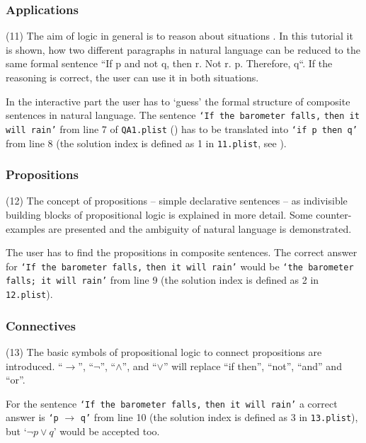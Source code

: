 \subsubsection{Applications}
\label{tut:11}

(11) The aim of logic in general is to reason about situations \cite{Huth:2004:LCS:975331}. 
In this tutorial it is shown, how two different paragraphs in natural language 
can be reduced to the same formal sentence “If p and not q, then r. Not r. p. Therefore, q“. 
If the reasoning is correct, the user can use it in both situations. 

In the interactive part the user has to ‘guess’ the formal structure of composite sentences in natural language. 
The sentence 
\verb+‘If the barometer falls,+ \verb+then it will rain’+ 
from line 7 of \verb+QA1.plist+ ()
has to be translated into
\verb+‘if p then q’+ from line 8 (the solution index is defined as 1 in \verb+11.plist+, see ).

\subsubsection{Propositions}
\label{tut:12}

(12) The concept of propositions – simple declarative sentences – 
as indivisible building blocks of propositional logic 
is explained in more detail. Some counter-examples are presented 
and the ambiguity of natural language is demonstrated.

The user has to find the propositions in composite sentences. 
The correct answer for 
\verb+‘If the barometer falls,+ \verb+then it will rain’+ 
would be  
\verb+‘the barometer falls; it will rain’+ 
from line 9 
(the solution index is defined as 2 in \verb+12.plist+).


\subsubsection{Connectives}
\label{tut:13}

(13) The basic symbols of propositional logic to connect propositions are introduced. 
“$\rightarrow$”, “$\neg$”, “$\wedge$”, and “$\vee$”
 will replace “if then”, “not”, “and” and “or”. 

For the sentence
\verb+‘If the barometer falls,+ \verb+then it will rain’+ 
a correct answer is
\verb+‘p+ $\rightarrow$ \verb+q’+ 
from line 10 
(the solution index is defined as 3 in \verb+13.plist+),
but 
‘$\neg p \vee q$’ would be accepted too.

